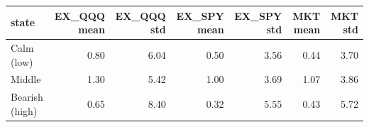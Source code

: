 \begin{tabular}{lrrrrrr}
\toprule
state & EX\_QQQ mean & EX\_QQQ std & EX\_SPY mean & EX\_SPY std & MKT mean & MKT std \\
\midrule
Calm (low) & 0.80 & 6.04 & 0.50 & 3.56 & 0.44 & 3.70 \\
Middle & 1.30 & 5.42 & 1.00 & 3.69 & 1.07 & 3.86 \\
Bearish (high) & 0.65 & 8.40 & 0.32 & 5.55 & 0.43 & 5.72 \\
\bottomrule
\end{tabular}
